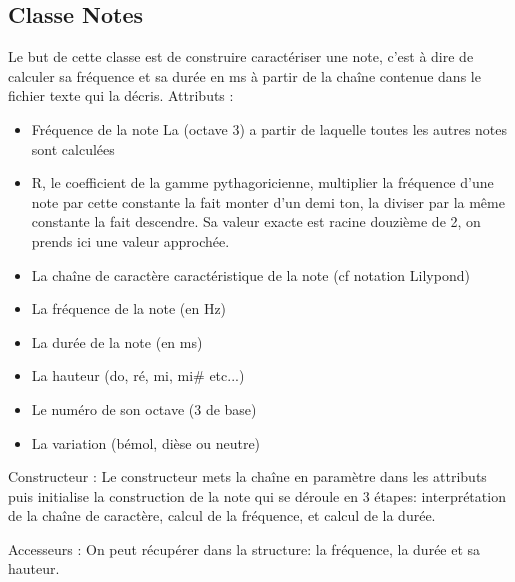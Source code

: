 \documentclass{EPUProjetPeiP}
\begin{document}
\subsection{Classe Notes}

Le but de cette classe est de construire caractériser une note, c'est à dire de calculer sa fréquence et sa durée en ms à partir de la chaîne contenue dans le fichier texte qui la décris.
Attributs :
\begin{itemize}
\item Fréquence de la note La (octave 3) a partir de laquelle toutes les autres notes sont calculées
\item R, le coefficient de la gamme pythagoricienne, multiplier la fréquence d'une note par cette constante la fait monter d'un demi ton, la diviser par la même constante la fait descendre. Sa valeur exacte est racine douzième de 2, on prends ici une valeur approchée.
\item La chaîne de caractère caractéristique de la note (cf notation Lilypond)
\item La fréquence de la note (en Hz)
\item La durée de la note (en ms)
\item La hauteur (do, ré, mi, mi\# etc...)
\item Le numéro de son octave (3 de base)
\item La variation (bémol, dièse ou neutre)
\end{itemize}

Constructeur :
Le constructeur mets la chaîne en paramètre dans les attributs puis initialise la construction de la note qui se déroule en 3 étapes: interprétation de la chaîne de caractère, calcul de la fréquence, et calcul de la durée.

Accesseurs :
On peut récupérer dans la structure: la fréquence, la durée et sa hauteur.
\end{document}
